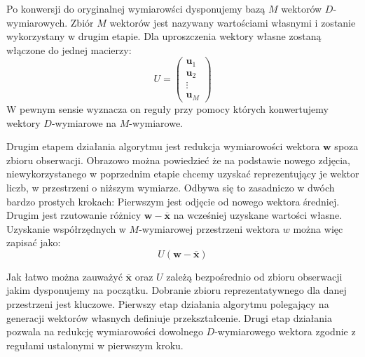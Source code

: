\documentclass[oneside, eng]{mgr}
\newcommand{\bb}{\textbf}
\begin{document}
Po konwersji do oryginalnej wymiarowści dysponujemy bazą $M$ wektorów $D$-wymiarowych. Zbiór $M$ wektorów jest nazywany wartościami własnymi i zostanie wykorzystany w drugim etapie. Dla uproszczenia wektory własne zostaną włączone do jednej macierzy:
\begin{equation}
	U = 
	\left( \begin{array}{l}
		\bb{u}_1 \\
		\bb{u}_2 \\
		\vdots	 \\
		\bb{u}_M
	\end{array} \right)
\end{equation}
W pewnym sensie wyznacza on reguły przy pomocy których konwertujemy wektory $D$-wymiarowe na $M$-wymiarowe.

Drugim etapem działania algorytmu jest redukcja wymiarowości wektora $\bb{w}$ spoza zbioru obserwacji. Obrazowo można powiedzieć że na podstawie nowego zdjęcia, niewykorzystanego w poprzednim etapie chcemy uzyskać reprezentujący je wektor liczb, w przestrzeni o niższym wymiarze. Odbywa się to zasadniczo w dwóch bardzo prostych krokach: Pierwszym jest odjęcie od nowego wektora średniej. Drugim jest rzutowanie różnicy $\bb{w} - \overline{\bb{x}}$ na wcześniej uzyskane wartości własne. Uzyskanie współrzędnych w $M$-wymiarowej przestrzeni wektora $w$ można więc zapisać jako:
\begin{equation}
	U ( \bb{w} - \overline{\bb{x}} ) 
\end{equation}

Jak łatwo można zauważyć $\overline{\bb{x}}$ oraz $U$ zależą bezpośrednio od zbioru obserwacji jakim dysponujemy na początku. Dobranie zbioru reprezentatywnego dla danej przestrzeni jest kluczowe. Pierwszy etap działania algorytmu polegający na generacji wektorów własnych definiuje przekształcenie. Drugi etap działania pozwala na redukcję wymiarowości dowolnego $D$-wymiarowego wektora zgodnie z regułami ustalonymi w pierwszym kroku.
\end{document}
